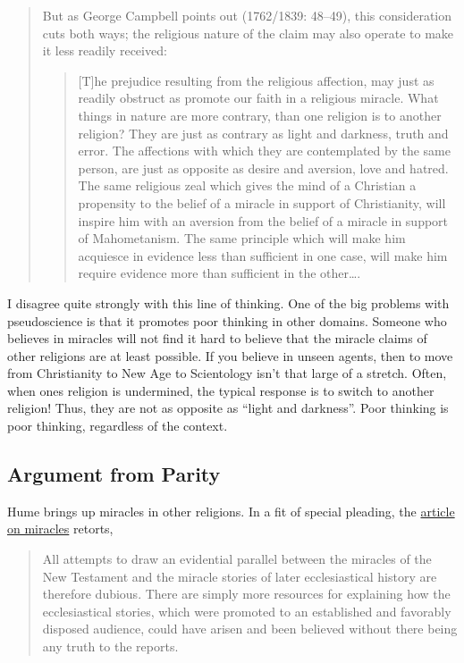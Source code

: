 \begin{quote}
But as George Campbell points out (1762/1839: 48--49), this
consideration cuts both ways; the religious nature of the claim may also
operate to make it less readily received:

\begin{quote}
{[}T{]}he prejudice resulting from the religious affection, may just as
readily obstruct as promote our faith in a religious miracle. What
things in nature are more contrary, than one religion is to another
religion? They are just as contrary as light and darkness, truth and
error. The affections with which they are contemplated by the same
person, are just as opposite as desire and aversion, love and hatred.
The same religious zeal which gives the mind of a Christian a propensity
to the belief of a miracle in support of Christianity, will inspire him
with an aversion from the belief of a miracle in support of
Mahometanism. The same principle which will make him acquiesce in
evidence less than sufficient in one case, will make him require
evidence more than sufficient in the other\ldots{}.
\end{quote}
\end{quote}

I disagree quite strongly with this line of thinking. One of the big
problems with pseudoscience is that it promotes poor thinking in other
domains. Someone who believes in miracles will not find it hard to
believe that the miracle claims of other religions are at least
possible. If you believe in unseen agents, then to move from
Christianity to New Age to Scientology isn't that large of a stretch.
Often, when ones religion is undermined, the typical response is to
switch to another religion! Thus, they are not as opposite as ``light
and darkness''. Poor thinking is poor thinking, regardless of the
context.

\subsection{Argument from Parity}\label{argument-from-parity}

Hume brings up miracles in other religions. In a fit of special
pleading, the \href{http://plato.stanford.edu/entries/miracles/}{article
on miracles} retorts,

\begin{quote}
All attempts to draw an evidential parallel between the miracles of the
New Testament and the miracle stories of later ecclesiastical history
are therefore dubious. There are simply more resources for explaining
how the ecclesiastical stories, which were promoted to an established
and favorably disposed audience, could have arisen and been believed
without there being any truth to the reports.
\end{quote}

